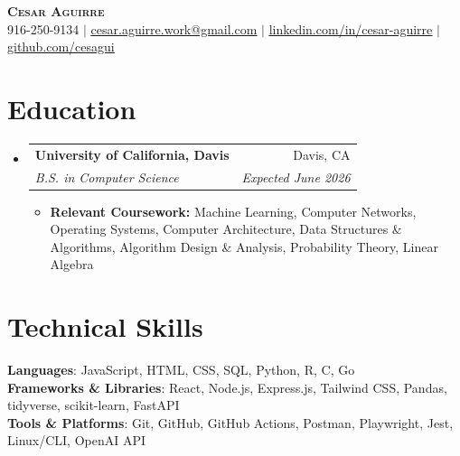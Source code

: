 \documentclass[letterpaper,11pt]{article}
\makeatletter
\newcommand{\resumeItem}[1]{
  \item\small{
    {#1 \vspace{-2pt}}
  }
}
\newcommand{\resumeSubheading}[4]{
  \vspace{-2pt}\item
    \begin{tabular*}{0.97\textwidth}[t]{l@{\extracolsep{\fill}}r}
      \textbf{#1} & #2 \\
      \textit{\small#3} & \textit{\small #4} \\
    \end{tabular*}\vspace{-7pt}
}
\newcommand{\resumeSubHeadingListStart}{\begin{itemize}[leftmargin=0.15in, label={}]}
\newcommand{\resumeSubHeadingListEnd}{\end{itemize}}
\newcommand{\resumeItemListStart}{\begin{itemize}}
\newcommand{\resumeItemListEnd}{\end{itemize}\vspace{-5pt}}
\makeatother
\begin{document}
\begin{center}
    \textbf{\Huge \scshape Cesar Aguirre} \\ \vspace{1pt}
    \small 916-250-9134 $|$ \href{mailto:cesar.aguirre.work@gmail.com}{\underline{cesar.aguirre.work@gmail.com}} $|$ 
    \href{https://www.linkedin.com/in/cesar-aguirre-930202385/}{\underline{linkedin.com/in/cesar-aguirre}} $|$
    \href{https://github.com/cesagui/}{\underline{github.com/cesagui}}
\end{center}


\section{Education}
  \resumeSubHeadingListStart
    \resumeSubheading
      {University of California, Davis}{Davis, CA}
      {B.S. in Computer Science}{Expected June 2026}
      \resumeItemListStart
        \resumeItem{\textbf{Relevant Coursework:} Machine Learning, Computer Networks, Operating Systems, Computer Architecture, Data Structures \& Algorithms, Algorithm Design \& Analysis, Probability Theory, Linear Algebra}
      \resumeItemListEnd
  \resumeSubHeadingListEnd

\section{Technical Skills}
 \begin{itemize}[leftmargin=0.15in, label={}]
    \small{\item{
     \textbf{Languages}{: JavaScript, HTML, CSS, SQL, Python, R, C, Go} \\
     \textbf{Frameworks \& Libraries}{: React, Node.js, Express.js, Tailwind CSS, Pandas, tidyverse, scikit-learn, FastAPI} \\
     \textbf{Tools \& Platforms}{: Git, GitHub, GitHub Actions, Postman, Playwright, Jest, Linux/CLI, OpenAI API}
    }}
 \end{itemize}


\end{document}
